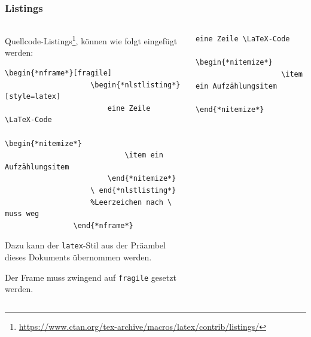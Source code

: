 \documentclass[german,notoc]{tudbeamer}%
\begin{document}
\begin{frame}[fragile]
	\frametitle{Listings}

	\begin{columns}[T,onlytextwidth]
		\begin{column}{.475\textwidth}
			Quellcode-Listings\footnote[frame]{\url{https://www.ctan.org/tex-archive/macros/latex/contrib/listings/}}, können wie folgt eingefügt werden:
			\begin{lstlisting}[gobble=8,style=latex,mathescape]
				\begin{*nframe*}[fragile]
					\begin{*nlstlisting*}[style=latex]
						eine Zeile \LaTeX-Code
						\begin{*nitemize*}
							\item ein Aufzählungsitem
						\end{*nitemize*}
					\ end{*nlstlisting*}
					%Leerzeichen nach \ muss weg
				\end{*nframe*}
			\end{lstlisting}
			Dazu kann der \texttt{latex}-Stil aus der Präambel dieses Dokuments übernommen werden.

			Der Frame muss zwingend auf \texttt{fragile} gesetzt werden.
		\end{column}
		\begin{column}{.475\textwidth}			
			\begin{lstlisting}[gobble=8,style=latex]
				eine Zeile \LaTeX-Code
				\begin{*nitemize*}
					\item ein Aufzählungsitem
				\end{*nitemize*}
			\end{lstlisting}
		\end{column}
	\end{columns}
\end{frame}
\end{document}

